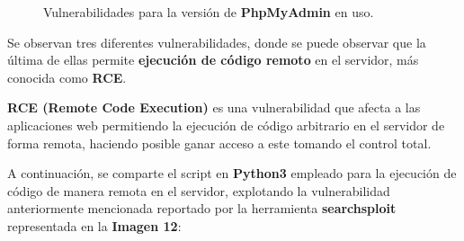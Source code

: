 \documentclass[a4paper]{article} %
\begin{document}
  \vspace{0.2cm}

  \begin{figure}[h]
    \centering
    \setlength{\fboxrule}{0.8pt}
    \caption{Vulnerabilidades para la versión de \textbf{PhpMyAdmin} en uso.}
  \end{figure}

  \vspace{0.2cm}
  Se observan tres diferentes vulnerabilidades, donde se puede observar que la última de ellas permite \textbf{ejecución de código remoto} en el servidor, más conocida como \textbf{RCE}.

  \begin{definicion}
    \textbf{RCE (Remote Code Execution)} es una vulnerabilidad que afecta a las aplicaciones web permitiendo la ejecución de código arbitrario en el servidor de forma remota, haciendo posible ganar acceso a este tomando el control total.
  \end{definicion}

  \clearpage

  A continuación, se comparte el script en \textbf{Python3} empleado para la ejecución de código de manera remota en el servidor, explotando la vulnerabilidad anteriormente mencionada reportado por la herramienta \textbf{searchsploit} representada en la \textbf{Imagen 12}:

  \vspace{0.2cm}
\end{document}
